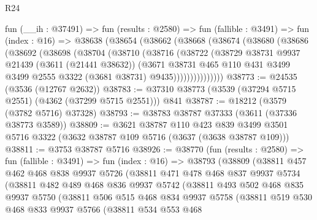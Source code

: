 \begin{lexlean}{R24}
\begin{coremodule}
    fun (__ih : @37491) =>
    fun (results : @2580) =>
    fun (fallible : @3491) =>
    fun (index : @16) =>
    @38638
      (@38654
        (@38662
          (@38668
            (@38674
              (@38680
                (@38686
                  (@38692
                    (@38698
                      (@38704
                        (@38710
                          (@38716
                            (@38722
                              (@38729
                                @38731
                                @9937
                                @21439
                                (@3611 (@21441 @38632))
                                (@3671
                                  @38731
                                  @465
                                  @110
                                  @431
                                  @3499
                                  @3499
                                  @2555
                                  @3322
                                  (@3681 @38731)
                                  @9435)))))))))))))))
@38773 := @24535 (@3536 (@12767 @2632))
@38783 := @37310 @38773 (@3539 (@37294 @5715 @2551) (@4362 (@37299 @5715 @2551))) @841
@38787 := @18212 (@3579 (@3782 @5716) @37328)
@38793 := @38783 @38787 @37333 (@3611 (@37336 @38773 @3589))
@38809 := @3621
    @38787
    @110
    @423
    @839
    @3499
    @3501
    @5716
    @3322
    (@3632 @38787 @109 @5716 (@3637 (@3638 @38787 @109)))
@38811 := @3753 @38787 @5716
@38926 := @38770
    (fun (results : @2580) =>
    fun (fallible : @3491) =>
    fun (index : @16) =>
    @38793
      (@38809
        (@38811
          @457
          @462
          @468
          @838
          @9937
          @5726
          (@38811
            @471
            @478
            @468
            @837
            @9937
            @5734
            (@38811
              @482
              @489
              @468
              @836
              @9937
              @5742
              (@38811
                @493
                @502
                @468
                @835
                @9937
                @5750
                (@38811
                  @506
                  @515
                  @468
                  @834
                  @9937
                  @5758
                  (@38811
                    @519
                    @530
                    @468
                    @833
                    @9937
                    @5766
                    (@38811
                      @534
                      @553
                      @468

\end{coremodule}
\end{lexlean}
